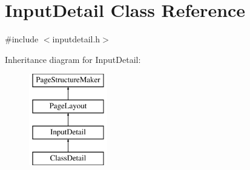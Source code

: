 \hypertarget{classInputDetail}{\section{Input\-Detail Class Reference}
\label{classInputDetail}
}


{\ttfamily \#include $<$inputdetail.\-h$>$}

Inheritance diagram for Input\-Detail\-:\begin{figure}[H]
\begin{center}
\leavevmode
\includegraphics[height=4.000000cm]{classInputDetail}
\end{center}
\end{figure}
